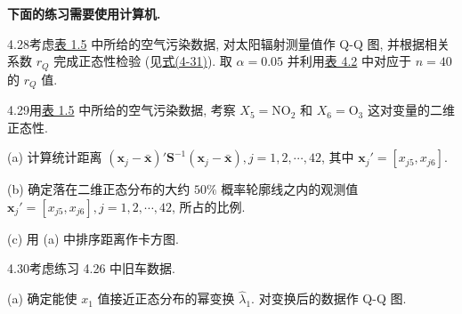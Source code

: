 \textbf{下面的练习需要使用计算机.}

4.28\quad 考虑\hyperref[tab:1.5]{表 1.5} 中所给的空气污染数据, 对太阳辐射测量值作 Q-Q 图, 并根据相关系数 $r_{Q}$ 完成正态性检验 (见\hyperref[eq:4-31]{式(4-31)}). 取 $\alpha=0.05$ 并利用\hyperref[tab:4.2]{表 4.2} 中对应于 $n=40$ 的 $r_{Q}$ 值.

4.29\quad 用\hyperref[tab:1.5]{表 1.5} 中所给的空气污染数据, 考察 $X_{5}=\mathrm{NO}_{2}$ 和 $X_{6}=\mathrm{O}_{3}$ 这对变量的二维正态性.

(a) 计算统计距离 $(\mathbf{x}_{j}-\bar{\mathbf{x}})'\mathbf{S}^{-1}(\mathbf{x}_{j}-\bar{\mathbf{x}}),j=1,2,\cdots,42$, 其中 $\mathbf{x}_{j}'=[x_{j5},x_{j6}]$.

(b) 确定落在二维正态分布的大约 $50\%$ 概率轮廓线之内的观测值 $\mathbf{x}_{j}'=[x_{j5},x_{j6}],j=1,2,\cdots,42$, 所占的比例.

(c) 用 (a) 中排序距离作卡方图.

4.30\quad 考虑练习 4.26 中旧车数据.

(a) 确定能使 $x_{1}$ 值接近正态分布的幂变换 $\hat{\lambda}_{1}$. 对变换后的数据作 Q-Q 图.
